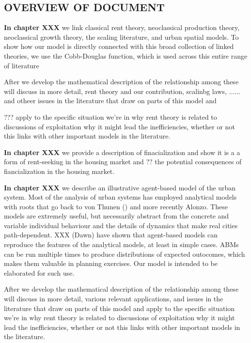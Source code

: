 \subsection{OVERVIEW OF DOCUMENT}
\color{blue}

\textbf{In chapter XXX}  we link classical rent theory, neoclassical production theory, neoclassical growth theory, the scaling literature, and urban spatial models.
To show how our model is directly connected with this broad collection of linked theories, we use the Cobb-Douglas function, which is used across this entire range of literature 

After we develop the mathematical description of the relationship among these will discuss  in more detail, rent theory and our contribution, scalinbg laws, ......  and otheer issues in the literature that draw on parts of this model and 

???  apply to the specific situation we're in why rent theory is related to discussions of exploitation why it might lead the inefficiencies, whether or not this links with other important models in the literature.

\textbf{In chapter XXX} we  provide a description of finacialization and show it is a a form of rent-seeking in the housing market and ?? the potential consequences of fiancialization in the housing market. 


\textbf{In chapter XXX} we  describe an illustrative agent-based model of the urban system. Most of the analysis of urban systems has employed analytical models with roots that go back to von Thunen () and more recently Alonzo. These models are extremely useful, but necessarily abstract from the concrete  and variable individual behaviour and  the details  of dynamics that make real cities path-dependent. XXX (Dawn) have shown that agent-based models can reproduce the features of the analytical models, at least in simple cases. ABMs can be run multiple times to produce distributions of expected outocomes, which makes them valuable in planning exercises.  Our model is intended to be elaborated  for such use. 

After we develop the mathematical description of the relationship among these will discuss in more detail, various relevant applications, and issues in the literature that draw on parts of this model and apply to the specific situation we're in why rent theory is related to discussions of exploitation why it might lead the inefficiencies, whether or not this links with other important models in the literature.


